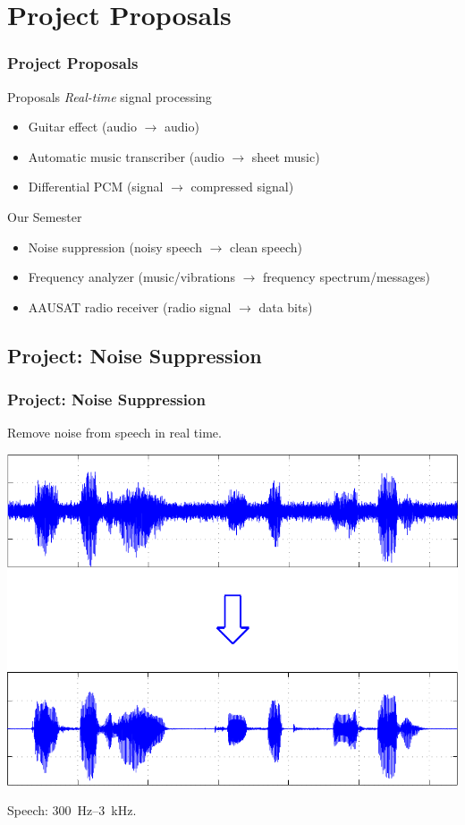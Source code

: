 \section{Project Proposals}

\begin{frame} \frametitle{Project Proposals}
    \begin{block}{Proposals}
        \emph{Real-time} signal processing
        \begin{itemize}
        \item Guitar effect (audio $\rightarrow$ audio)
        \item Automatic music transcriber (audio $\rightarrow$ sheet music)
        \item Differential PCM (signal $\rightarrow$ compressed signal)
        \end{itemize}
    \end{block}
\pause
    \begin{block}{Our Semester}
        \begin{itemize}
        \item Noise suppression (noisy speech $\rightarrow$ clean speech)
        \item Frequency analyzer (music/vibrations $\rightarrow$ frequency spectrum/messages)
        \item AAUSAT radio receiver (radio signal $\rightarrow$ data bits)
        \end{itemize}
    \end{block}
\end{frame}

\subsection{Project: Noise Suppression}
\begin{frame}
    \frametitle{Project: Noise Suppression}
    Remove noise from speech in real time.
    \begin{center}
        \includegraphics[scale=0.5]{img/noise_1}
    \end{center}
    Speech: \SI{300}{Hz}--\SI{3}{kHz}.
\end{frame}

